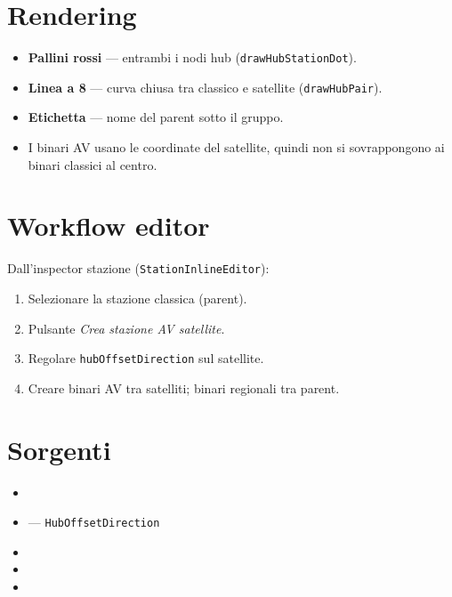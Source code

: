 \section{Rendering}

\begin{itemize}
  \item \textbf{Pallini rossi} --- entrambi i nodi hub
        (\texttt{drawHubStationDot}).
  \item \textbf{Linea a 8} --- curva chiusa tra classico e satellite
        (\texttt{drawHubPair}).
  \item \textbf{Etichetta} --- nome del parent sotto il gruppo.
  \item I binari AV usano le coordinate del satellite, quindi non si
        sovrappongono ai binari classici al centro.
\end{itemize}

\section{Workflow editor}

Dall'inspector stazione (\texttt{StationInlineEditor}):
\begin{enumerate}
  \item Selezionare la stazione classica (parent).
  \item Pulsante \emph{Crea stazione AV satellite}.
  \item Regolare \texttt{hubOffsetDirection} sul satellite.
  \item Creare binari AV tra satelliti; binari regionali tra parent.
\end{enumerate}

\section{Sorgenti}

\begin{itemize}
  \item {}
  \item {} --- \texttt{HubOffsetDirection}
  \item {}
  \item {}
  \item {}
\end{itemize}
